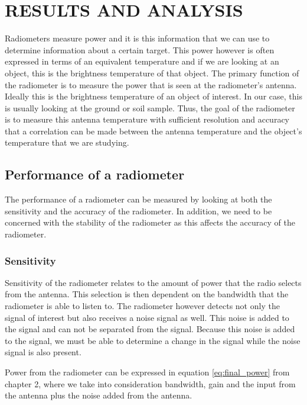 

\chapter{RESULTS AND ANALYSIS}

Radiometers measure power and it is this information that we can use to determine information about a certain target.  This power however is often expressed in terms of an equivalent temperature and if we are looking at an object, this is the brightness temperature of that object.  The primary function of the radiometer is to measure the power that is seen at the radiometer's antenna.  Ideally this is the brightness temperature of an object of interest.  In our case, this is usually looking at the ground or soil sample.  Thus, the goal of the radiometer is to measure this antenna temperature with sufficient resolution and accuracy that a correlation can be made between the antenna temperature and the object's temperature that we are studying.

\section{Performance of a radiometer}
The performance of a radiometer can be measured by looking at both the sensitivity and the accuracy of the radiometer.  In addition, we need to be concerned with the stability of the radiometer as this affects the accuracy of the radiometer.


\subsection{Sensitivity}
Sensitivity of the radiometer relates to the amount of power that the radio selects from the antenna.  This selection is then dependent on the bandwidth that the radiometer is able to listen to.  The radiometer however detects not only the signal of interest but also receives a noise signal as well.  This noise is added to the signal and can not be separated from the signal.  Because this noise is added to the signal, we must be able to determine a change in the signal while the noise signal is also present.  

Power from the radiometer can be expressed in equation \ref{eq:final_power} from chapter 2, where we take into consideration bandwidth, gain and the input from the antenna plus the noise added from the antenna.  

